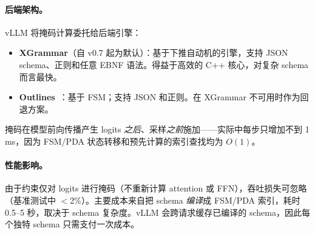 \paragraph{后端架构。}
\label{backend-architecture.}

vLLM 将掩码计算委托给后端引擎：

\begin{itemize}
  \item \textbf{XGrammar}（自 v0.7 起为默认）：基于下推自动机的引擎，支持 JSON schema、正则和任意 EBNF 语法。得益于高效的 C++ 核心，对复杂 schema 而言最快。
  \item \textbf{Outlines}~\cite{willard2023outlines}：基于 FSM；支持 JSON 和正则。在 XGrammar 不可用时作为回退方案。
\end{itemize}

掩码在模型前向传播产生 logits \emph{之后}、采样\emph{之前}施加——实际中每步只增加不到 1 ms，因为 FSM/PDA 状态转移和预先计算的索引查找均为 $O(1)$。

\paragraph{性能影响。}
\label{performance-impact.}

由于约束仅对 logits 进行掩码（不重新计算 attention 或 FFN），吞吐损失可忽略（基准测试中 $<$2\%）。主要成本来自把 schema \emph{编译}成 FSM/PDA 索引，耗时 0.5--5 秒，取决于 schema 复杂度。vLLM 会跨请求缓存已编译的 schema，因此每个独特 schema 只需支付一次成本。

